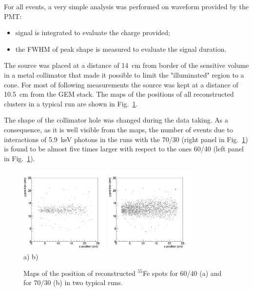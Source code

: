 \documentclass[a4paper,11pt]{article}
\begin{document}
For all events, a very simple analysis was performed on waveform provided by the PMT:
\begin{itemize}
    \item signal is integrated to evaluate the charge provided; 
    \item the FWHM of peak shape is measured to evaluate the signal duration.
\end{itemize}

The source was placed at a distance of 14~cm from border of the sensitive volume in a metal collimator that made it possible to limit the "illuminated" region to a cone. 
For most of following measurements the source was kept at a distance of 10.5~cm from the GEM stack. 
The maps of the positions of all reconstructed clusters in a typical run are shown in Fig.~\ref{fig:map}. 

The shape of the collimator hole was changed during the data taking. 
As a consequence, as it is well visible from the maps, the number of events due to interactions of 5.9~keV photons in the runs with the 70/30 (right panel in Fig.~\ref{fig:map}) is found to be almost five times larger with respect to the ones 60/40 (left panel in Fig.~\ref{fig:map}).

\begin{figure}[ht]
\centering
\includegraphics[width=0.4\textwidth]{Figures/map_6040.png}
\includegraphics[width=0.4\textwidth]{Figures/map_7030.png}\\
\vspace{-0.3cm}
\mbox{a)} \hspace{6cm} \mbox{b)}
\vspace{-0.3cm}
\caption{Maps of the position of reconstructed $^{55}$Fe spots for 60/40 (a) and for 70/30 (b) in two typical runs.} 
\label{fig:map}
\end{figure}
\end{document}
